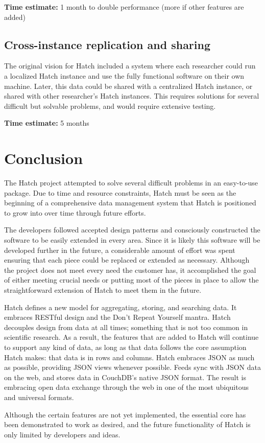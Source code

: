 \textbf{Time estimate:} 1 month to double performance (more if other features are added)

\subsection{Cross-instance replication and sharing}
The original vision for Hatch included a system where each researcher could
run a localized Hatch instance and use the fully functional software on their
own machine.  Later, this data could be shared with a centralized Hatch instance,
or shared with other researcher's Hatch instances.  This requires solutions for
several difficult but solvable problems, and would require extensive testing.

\textbf{Time estimate:} 5 months

\section{Conclusion}
The Hatch project attempted to solve several difficult problems in an easy-to-use
package.  Due to time and resource constraints, Hatch must be seen as the beginning
of a comprehensive data management system that Hatch is positioned to grow into over time
through future efforts.

The developers followed accepted design patterns and consciously constructed the
software to be easily extended in every area.  Since it is likely this software
will be developed further in the future, a considerable amount of effort was spent
ensuring that each piece could be replaced or extended as necessary. Although the
project does not meet every need the customer has, it accomplished the goal of 
either meeting crucial needs or putting most of the pieces in place to allow the
straightforward extension of Hatch to meet them in the future.

Hatch defines a new model for aggregating, storing, and searching data. It embraces
RESTful design and the Don't Repeat Yourself mantra.
Hatch decouples design from data at all times;
something that is not too common in scientific research. As a result, the features
that are added to Hatch will continue to support any kind of data, as long as that 
data follows the core assumption Hatch makes: that data is in rows and columns.
Hatch embraces JSON as much as possible, providing JSON views whenever possible.
Feeds sync with JSON data on the web, and stores data in CouchDB's
native JSON format. The result is embracing open data exchange through the web in
one of the most ubiquitous and universal formats.

Although the certain features are not yet implemented, the essential core has
been demonstrated to work as desired, and the future functionality of Hatch is
only limited by developers and ideas.
